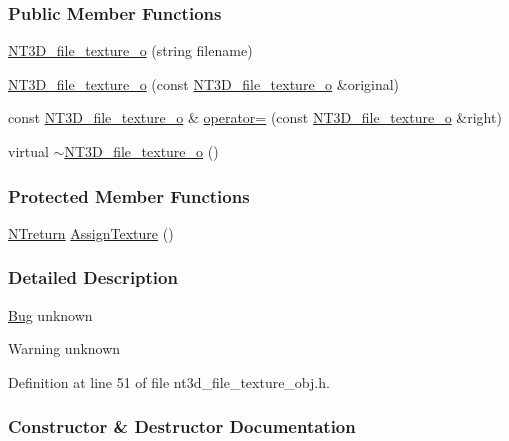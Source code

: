 \subsubsection*{Public Member Functions}
\begin{DoxyCompactItemize}
\item 
\hyperlink{class_n_t3_d__file__texture__o_ac7611cc30c63e92526187e1743d835e9}{NT3D\_\-file\_\-texture\_\-o} (string filename)
\item 
\hyperlink{class_n_t3_d__file__texture__o_a34cbae47514f11ba85f4c668413de389}{NT3D\_\-file\_\-texture\_\-o} (const \hyperlink{class_n_t3_d__file__texture__o}{NT3D\_\-file\_\-texture\_\-o} \&original)
\item 
const \hyperlink{class_n_t3_d__file__texture__o}{NT3D\_\-file\_\-texture\_\-o} \& \hyperlink{class_n_t3_d__file__texture__o_a082fee9eec8f5d1707bcaa5388f2b5c2}{operator=} (const \hyperlink{class_n_t3_d__file__texture__o}{NT3D\_\-file\_\-texture\_\-o} \&right)
\item 
virtual \hyperlink{class_n_t3_d__file__texture__o_aa860fcaec0e22235a249f399907c3907}{$\sim$NT3D\_\-file\_\-texture\_\-o} ()
\end{DoxyCompactItemize}
\subsubsection*{Protected Member Functions}
\begin{DoxyCompactItemize}
\item 
\hyperlink{nt__types_8h_ab9564ee8f091e809d21b8451c6683c53}{NTreturn} \hyperlink{class_n_t3_d__file__texture__o_a8171d64069586b2daa0f8ede8859ffb4}{AssignTexture} ()
\end{DoxyCompactItemize}


\subsubsection{Detailed Description}
\begin{Desc}
\item[\hyperlink{bug__bug000015}{Bug}]unknown \end{Desc}
\begin{DoxyWarning}{Warning}
unknown 
\end{DoxyWarning}


Definition at line 51 of file nt3d\_\-file\_\-texture\_\-obj.h.



\subsubsection{Constructor \& Destructor Documentation}
